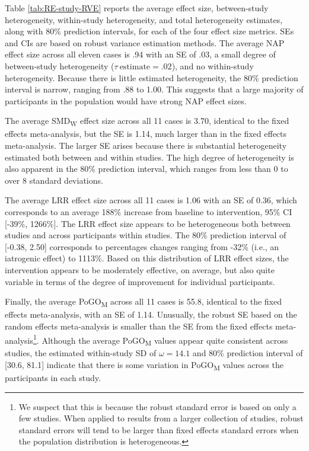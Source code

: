\documentclass[
]{book}
\begin{document}
Table \ref{tab:RE-study-RVE} reports the average effect size, between-study heterogeneity, within-study heterogeneity, and total heterogeneity estimates, along with 80\% prediction intervals, for each of the four effect size metrics. SEs and CIs are based on robust variance estimation methods. The average NAP effect size across all eleven cases is .94 with an SE of .03, a small degree of between-study heterogeneity (\(\tau \  \text{estimate} = .02\)), and no within-study heterogeneity. Because there is little estimated heterogeneity, the 80\% prediction interval is narrow, ranging from .88 to 1.00. This suggests that a large majority of participants in the population would have strong NAP effect sizes.

The average SMD\textsubscript{W} effect size across all 11 cases is 3.70, identical to the fixed effects meta-analysis, but the SE is 1.14, much larger than in the fixed effects meta-analysis. The larger SE arises because there is substantial heterogeneity estimated both between and within studies. The high degree of heterogeneity is also apparent in the 80\% prediction interval, which ranges from less than 0 to over 8 standard deviations.

The average LRR effect size across all 11 cases is 1.06 with an SE of 0.36, which corresponds to an average 188\% increase from baseline to intervention, 95\% CI {[}-39\%, 1266\%{]}. The LRR effect size appears to be heterogeneous both between studies and across participants within studies. The 80\% prediction interval of {[}-0.38, 2.50{]} corresponds to percentages changes ranging from -32\% (i.e., an iatrogenic effect) to 1113\%. Based on this distribution of LRR effect sizes, the intervention appears to be moderately effective, on average, but also quite variable in terms of the degree of improvement for individual participants.

Finally, the average PoGO\textsubscript{M} across all 11 cases is 55.8, identical to the fixed effects meta-analysis, with an SE of 1.14. Unusually, the robust SE based on the random effects meta-analysis is smaller than the SE from the fixed effects meta-analysis\footnote{We suspect that this is because the robust standard error is based on only a few studies. When applied to results from a larger collection of studies, robust standard errors will tend to be larger than fixed effects standard errors when the population distribution is heterogeneous.}. Although the average PoGO\textsubscript{M} values appear quite consistent across studies, the estimated within-study SD of \(\omega = 14.1\) and 80\% prediction interval of {[}30.6, 81.1{]} indicate that there is some variation in PoGO\textsubscript{M} values across the participants in each study.
\end{document}
